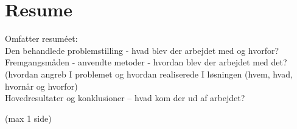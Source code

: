 \chapter{Resume}
Omfatter resuméet:\\
Den behandlede problemstilling - hvad blev der arbejdet med og hvorfor?\\
Fremgangsmåden - anvendte metoder - hvordan blev der arbejdet med det? \\
(hvordan angreb I problemet og hvordan realiserede I løsningen (hvem, hvad, hvornår og hvorfor)\\
Hovedresultater og konklusioner  – hvad kom der ud af arbejdet?\\
\begin{Large}
(max  1 side)
\end{Large}